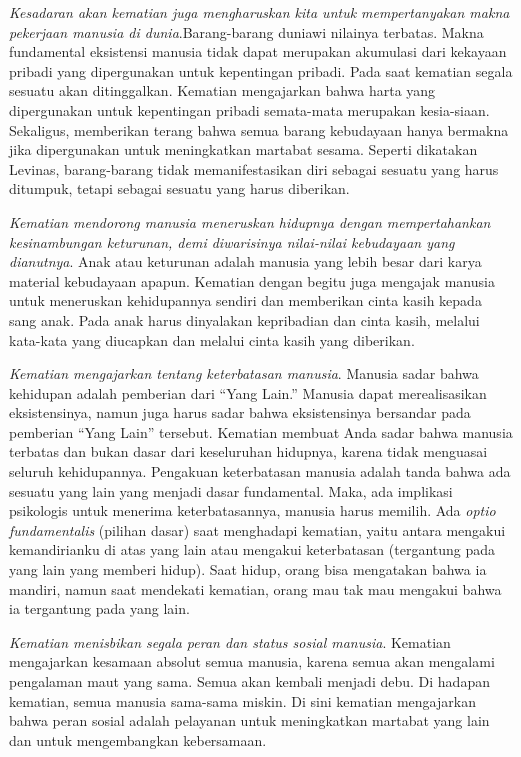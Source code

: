 \documentclass[10pt,a4paper]{article}
\begin{document}
\begin{multicols}{2}
\emph{Kesadaran akan kematian juga mengharuskan kita untuk
mempertanyakan makna pekerjaan manusia di dunia}.Barang-barang duniawi
nilainya terbatas. Makna fundamental eksistensi manusia tidak dapat
merupakan akumulasi dari kekayaan pribadi yang dipergunakan untuk
kepentingan pribadi. Pada saat kematian segala sesuatu akan
ditinggalkan. Kematian mengajarkan bahwa harta yang dipergunakan untuk
kepentingan pribadi semata-mata merupakan kesia-siaan. Sekaligus,
memberikan terang bahwa semua barang kebudayaan hanya bermakna jika
dipergunakan untuk meningkatkan martabat sesama. Seperti dikatakan
Levinas, barang-barang tidak memanifestasikan diri sebagai sesuatu yang
harus ditumpuk, tetapi sebagai sesuatu yang harus diberikan.

\emph{Kematian mendorong manusia meneruskan hidupnya dengan
mempertahankan kesinambungan keturunan, demi diwarisinya nilai-nilai
kebudayaan yang dianutnya}. Anak atau keturunan adalah manusia yang
lebih besar dari karya material kebudayaan apapun. Kematian dengan
begitu juga mengajak manusia untuk meneruskan kehidupannya sendiri dan
memberikan cinta kasih kepada sang anak. Pada anak harus dinyalakan
kepribadian dan cinta kasih, melalui kata-kata yang diucapkan dan
melalui cinta kasih yang diberikan.

\emph{Kematian mengajarkan tentang keterbatasan manusia}. Manusia sadar
bahwa kehidupan adalah pemberian dari ``Yang Lain.'' Manusia dapat
merealisasikan eksistensinya, namun juga harus sadar bahwa eksistensinya
bersandar pada pemberian ``Yang Lain'' tersebut. Kematian membuat Anda
sadar bahwa manusia terbatas dan bukan dasar dari keseluruhan hidupnya,
karena tidak menguasai seluruh kehidupannya. Pengakuan keterbatasan
manusia adalah tanda bahwa ada sesuatu yang lain yang menjadi dasar
fundamental. Maka, ada implikasi psikologis untuk menerima
keterbatasannya, manusia harus memilih. Ada \emph{optio fundamentalis}
(pilihan dasar) saat menghadapi kematian, yaitu antara mengakui
kemandirianku di atas yang lain atau mengakui keterbatasan (tergantung
pada yang lain yang memberi hidup). Saat hidup, orang bisa mengatakan
bahwa ia mandiri, namun saat mendekati kematian, orang mau tak mau
mengakui bahwa ia tergantung pada yang lain.

\emph{Kematian menisbikan segala peran dan status sosial manusia}.
Kematian mengajarkan kesamaan absolut semua manusia, karena semua akan
mengalami pengalaman maut yang sama. Semua akan kembali menjadi debu. Di
hadapan kematian, semua manusia sama-sama miskin. Di sini kematian
mengajarkan bahwa peran sosial adalah pelayanan untuk meningkatkan
martabat yang lain dan untuk mengembangkan kebersamaan.


\end{multicols}
\end{document}
